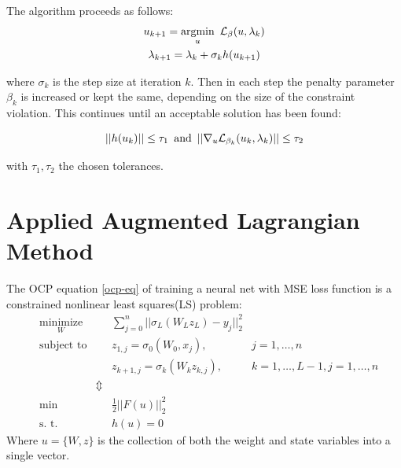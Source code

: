 The algorithm proceeds as follows:
\begin{gather*}
	u_{k+1} = \underset{u}{\text{argmin}} \hspace{.5em} \mathcal{L}_\beta(u,\lambda_k) \\
	\lambda_{k+1} = \lambda_k + \sigma_k h(u_{k+1})
\end{gather*}

where $\sigma_k$ is the step size at iteration $k$. Then in each step the penalty parameter $\beta_k$ is increased or kept the same, depending on the size of the constraint violation. This continues until an acceptable solution has been found:

\begin{equation}
	||h(u_k)|| \leq \tau_1 \hspace{.5em}\text{and}\hspace{.5em} ||\nabla_u\mathcal{L}_{\beta_k}(u_k,\lambda_k)|| \leq \tau_2
\end{equation}

with $\tau_1,\tau_2$ the chosen tolerances.

\section{Applied Augmented Lagrangian Method}

The OCP equation \ref{ocp-eq} of training a neural net with MSE loss function is a constrained nonlinear least squares(LS) problem:
\begin{equation*}
	\begin{aligned}
	& \underset{W}{\text{minimize}}
	& & \sum\limits_{j=0}^{n}||\sigma_L(W_Lz_L) - y_j||^2_2 \\
	& \text{subject to}
	& & z_{1,j} = \sigma_0(W_0,x_j), &j = 1,\ldots,n \\
	& & & z_{k+1,j} = \sigma_k(W_kz_{k,j}), &k = 1,\ldots,L-1,j = 1,\ldots,n \\
    & & \Updownarrow \\
	& \text{min}
	&  & \frac{1}{2} ||F(u)||^2_2 \\
	& \text{s. t.}
	& &  h(u) = 0
	\end{aligned}
\end{equation*}
Where $u = \{W,z\}$ is the collection of both the weight and state variables into a single vector.

